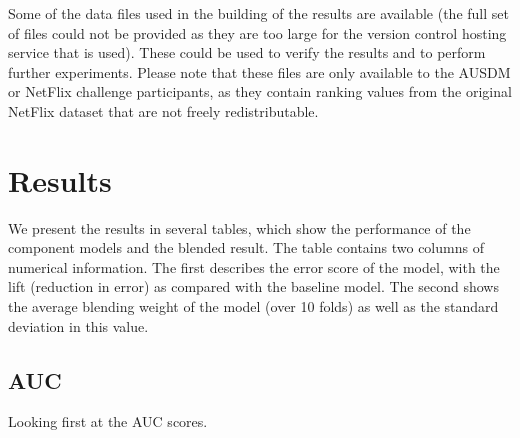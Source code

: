 \documentclass{article}
\begin{document}
Some of the data files used in the building of the results are available (the full set of files could not be provided as they are too large for the version control hosting service that is used).  These could be used to verify the results and to perform further experiments.  Please note that these files are only available to the AUSDM or NetFlix challenge participants, as they contain ranking values from the original NetFlix dataset that are not freely redistributable.

\section{Results}


We present the results in several tables, which show the performance of the component models and the blended result.  The table contains two columns of numerical information.  The first describes the error score of the model, with the lift (reduction in error) as compared with the baseline model.  The second shows the average blending weight of the model (over 10 folds) as well as the standard deviation in this value.

\subsection{AUC}

Looking first at the AUC scores.

\end{document}
